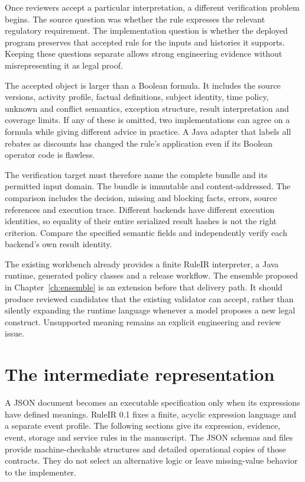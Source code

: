 \documentclass[12pt,a4paper,oneside,openany]{book}
\begin{document}
Once reviewers accept a particular interpretation, a different verification
problem begins. The source question was whether the rule expresses the relevant
regulatory requirement. The implementation question is whether the deployed
program preserves that accepted rule for the inputs and histories it supports.
Keeping these questions separate allows strong engineering evidence without
misrepresenting it as legal proof.

The accepted object is larger than a Boolean formula. It includes the source
versions, activity profile, factual definitions, subject identity, time policy,
unknown and conflict semantics, exception structure, result interpretation and
coverage limits. If any of these is omitted, two implementations can agree on a
formula while giving different advice in practice. A Java adapter that labels
all rebates as discounts has changed the rule's application even if its Boolean
operator code is flawless.

The verification target must therefore name the complete bundle and its
permitted input domain. The bundle is immutable and content-addressed. The
comparison includes the decision, missing and blocking facts, errors, source
references and execution trace. Different backends have different execution
identities, so equality of their entire serialized result hashes is not the
right criterion. Compare the specified semantic fields and independently verify
each backend's own result identity.

The existing workbench already provides a finite RuleIR interpreter, a Java
runtime, generated policy classes and a release workflow. The ensemble proposed
in Chapter~\ref{ch:ensemble} is an extension before that delivery path. It should
produce reviewed candidates that the existing validator can accept, rather than
silently expanding the runtime language whenever a model proposes a new legal
construct. Unsupported meaning remains an explicit engineering and review issue.

\section{The intermediate representation}
\label{merge:P-03-product:02}


A JSON document becomes an executable specification only when its expressions
have defined meanings. RuleIR 0.1 fixes a finite, acyclic expression language and
a separate event profile. The following sections give its expression, evidence,
event, storage and service rules in the manuscript. The JSON schemas and
 files provide machine-checkable structures and detailed
operational copies of those contracts. They do not select an alternative logic
or leave missing-value behavior to the implementer.
\end{document}
